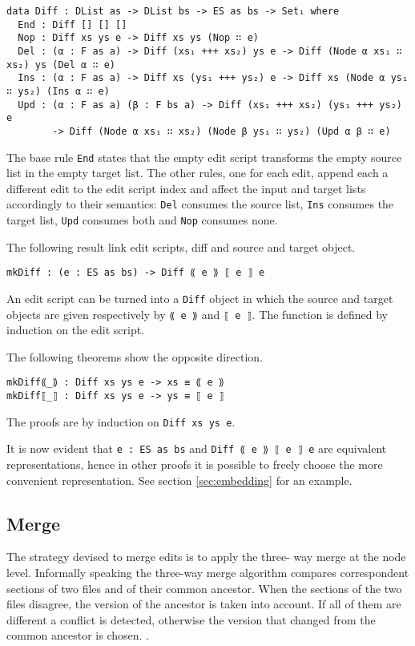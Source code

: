 \documentclass[../Thesis.tex]{subfiles}
\begin{document}
	\begin{verbatim}
data Diff : DList as -> DList bs -> ES as bs -> Set₁ where
  End : Diff [] [] []
  Nop : Diff xs ys e -> Diff xs ys (Nop ∷ e)
  Del : (α : F as a) -> Diff (xs₁ +++ xs₂) ys e -> Diff (Node α xs₁ ∷ xs₂) ys (Del α ∷ e)
  Ins : (α : F as a) -> Diff xs (ys₁ +++ ys₂) e -> Diff xs (Node α ys₁ ∷ ys₂) (Ins α ∷ e)
  Upd : (α : F as a) (β : F bs a) -> Diff (xs₁ +++ xs₂) (ys₁ +++ ys₂) e 
        -> Diff (Node α xs₁ ∷ xs₂) (Node β ys₁ ∷ ys₂) (Upd α β ∷ e)
\end{verbatim}

	The base rule \texttt{End} states that the empty edit script 
	transforms the empty source list in the empty target list.
	The other rules, one for each edit, append each a different edit 
	to the edit script 	index and affect the input and target lists 
	accordingly to their 	semantics: 
	\texttt{Del} consumes the source list, \texttt{Ins} consumes the target list, 
	\texttt{Upd} consumes both and \texttt{Nop} consumes none.	

	The following result link edit scripts, diff and source and target object.
	
\begin{verbatim}	
mkDiff : (e : ES as bs) -> Diff ⟪ e ⟫ ⟦ e ⟧ e
\end{verbatim}

	An edit script can be turned into a \texttt{Diff} object in which the
	source and target objects are given respectively by \texttt{⟪ e ⟫} and 
	\texttt{⟦ e ⟧}.
	The function is defined by induction on the edit script.
	
	The following theorems show the opposite direction.
\begin{verbatim}
mkDiff⟪_⟫ : Diff xs ys e -> xs ≡ ⟪ e ⟫
mkDiff⟦_⟧ : Diff xs ys e -> ys ≡ ⟦ e ⟧
\end{verbatim}

	The proofs are by induction on \texttt{Diff xs ys e}.
	
	It is now evident that \texttt{e : ES as bs} and \texttt{Diff  ⟪ e ⟫ ⟦ e ⟧ e} 
	are equivalent	representations, hence in other proofs it is possible to freely 
	choose the more convenient representation. See section 
	\ref{sec:embedding} for an example.
	
	\subsection{Merge}	
	The strategy devised to merge edits is to apply the three-
	way merge at the node level. 
	Informally speaking the three-way merge algorithm 	
	compares correspondent sections of two files and of their common 
	ancestor.
	When the sections of the two files disagree, the version of the ancestor
	is taken into account. If all of them are different a conflict is detected,
	otherwise the version that changed from the common ancestor is chosen.
	.
	
\end{document}
